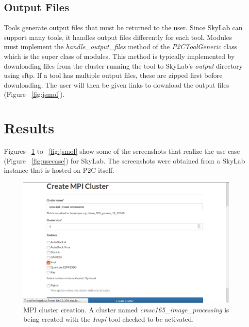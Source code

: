 \subsection{Output Files}
Tools generate output files that must be returned to the user. Since SkyLab can support many tools, it handles output files differently for each tool. Modules must implement the \textit{handle\_output\_files} method of the \textit{P2CToolGeneric} class which is the super class of modules. This method is typically implemented by downloading files from the cluster running the tool to SkyLab's \textit{output} directory using sftp. If a tool has multiple output files, these are zipped first before downloading. The user will then be given links to download the output files (Figure ~\ref{fig:jsmol}).
	
\section{Results}
Figures ~\ref{fig:mpicreate} to ~\ref{fig:jsmol} show some of the screenshots that realize the use case (Figure ~\ref{fig:usecase}) for SkyLab. The screenshots were obtained from a SkyLab instance that is hosted on P2C itself.

		
\begin{figure}			
	\includegraphics[scale=0.93]{./images/n_create_cluster_impi_printed.png}
	\caption{\label{fig:mpicreate}MPI cluster creation. A cluster named \textit{cmsc165\_image\_processing} is being created with the \textit{Impi} tool checked to be activated.}			
\end{figure}	
	
